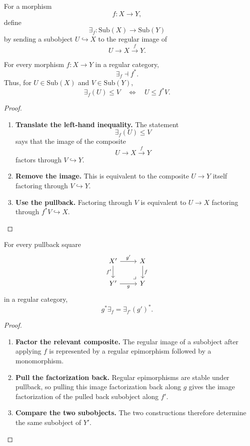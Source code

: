 \begin{definition}
\label{def:relative-existential-image}
For a morphism
\[
f:X\to Y,
\]
define
\[
\exists_f:\mathrm{Sub}(X)\to\mathrm{Sub}(Y)
\]
by sending a subobject \(U\hookrightarrow X\) to the regular image of
\[
U\to X\xrightarrow{f}Y.
\]
\end{definition}

\begin{proposition}
\label{prop:relative-existential-adjunction}
For every morphism \(f:X\to Y\) in a regular category,
\[
\exists_f\dashv f^\ast.
\]
Thus, for \(U\in\mathrm{Sub}(X)\) and \(V\in\mathrm{Sub}(Y)\),
\[
\exists_f(U)\le V
\quad\Longleftrightarrow\quad
U\le f^\ast V.
\]
\end{proposition}

\begin{proof}
\leavevmode
\begin{enumerate}
\item \textbf{Translate the left-hand inequality.}
The statement
\[
\exists_f(U)\le V
\]
says that the image of the composite
\[
U\to X\xrightarrow{f}Y
\]
factors through \(V\hookrightarrow Y\).

\item \textbf{Remove the image.}
This is equivalent to the composite \(U\to Y\) itself factoring through
\(V\hookrightarrow Y\).

\item \textbf{Use the pullback.}
Factoring through \(V\) is equivalent to \(U\to X\) factoring through
\(f^\ast V\hookrightarrow X\).
\end{enumerate}
\end{proof}

\begin{proposition}
\label{prop:relative-regular-beck-chevalley}
For every pullback square
\[
\begin{tikzcd}
X' \arrow[r,"g'"] \arrow[d,"f'"']
&
X \arrow[d,"f"]
\\
Y' \arrow[r,"g"']
&
Y
\arrow[ul,phantom,very near start,"\lrcorner"]
\end{tikzcd}
\]
in a regular category,
\[
g^\ast\exists_f=\exists_{f'}(g')^\ast.
\]
\end{proposition}

\begin{proof}
\leavevmode
\begin{enumerate}
\item \textbf{Factor the relevant composite.}
The regular image of a subobject after applying \(f\) is represented by a
regular epimorphism followed by a monomorphism.

\item \textbf{Pull the factorization back.}
Regular epimorphisms are stable under pullback, so pulling this image
factorization back along \(g\) gives the image factorization of the pulled
back subobject along \(f'\).

\item \textbf{Compare the two subobjects.}
The two constructions therefore determine the same subobject of \(Y'\).
\end{enumerate}
\end{proof}

